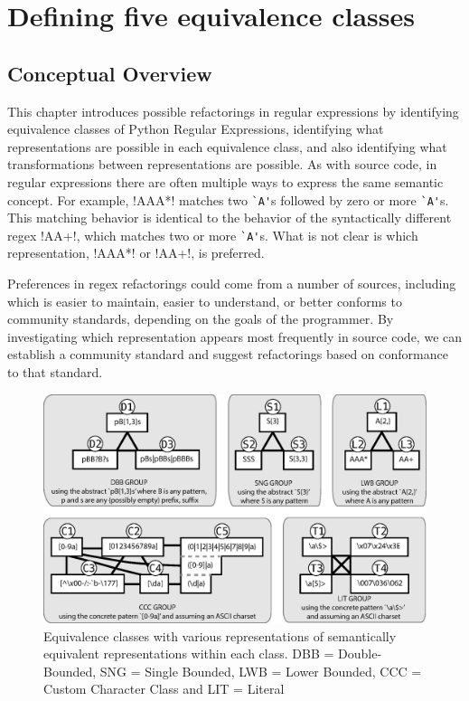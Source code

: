 \section{Defining five equivalence classes}
\label{sec:equivClasses}

\subsection{Conceptual Overview}
This chapter introduces possible refactorings in regular expressions by identifying equivalence classes of Python Regular Expressions, identifying what representations are possible in each equivalence class, and also identifying what transformations between representations are possible. As with source code, in regular expressions there are often multiple ways to express the same semantic concept.
For example, \cverb!AAA*! matches two \verb!`A'!s followed by zero or more \verb!`A'!s.  This matching behavior is identical to the behavior of the syntactically different regex \cverb!AA+!, which matches two or more \verb!`A'!s.  What is not clear is which representation,  \cverb!AAA*!  or  \cverb!AA+!, is preferred.

Preferences in regex refactorings could come from a number of sources, including which is easier to maintain, easier to understand, or better conforms to community standards, depending on the goals of the programmer.  By investigating which representation appears most frequently in source code, we can establish a community standard and suggest refactorings based on conformance to that standard.


\begin{figure}[tb]
\centering
\includegraphics[width=\textwidth]{nontex/illustrations/refactoringTree.eps}
\vspace{-12pt}
\caption{Equivalence classes with various representations of semantically equivalent representations within each class. DBB = Double-Bounded, SNG = Single Bounded, LWB = Lower Bounded, CCC = Custom Character Class and LIT = Literal}
\vspace{-6pt}
\label{fig:refactoringTree}
\end{figure}

